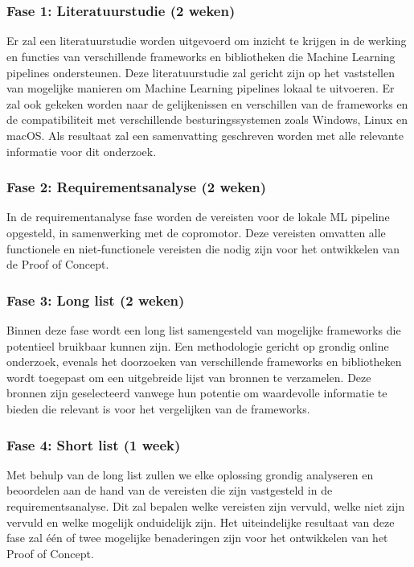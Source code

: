
\chapter{}%
\label{ch:methodologie}

\subsection{Fase 1: Literatuurstudie (2 weken)}
Er zal een literatuurstudie worden uitgevoerd om inzicht te krijgen in de werking en
functies van verschillende frameworks en bibliotheken die Machine Learning pipelines ondersteunen.
Deze literatuurstudie zal gericht zijn op het vaststellen van mogelijke manieren om Machine Learning pipelines lokaal te uitvoeren. Er zal ook gekeken worden naar de gelijkenissen en verschillen van de frameworks en de compatibiliteit met verschillende besturingssystemen zoals Windows, Linux en macOS.
Als resultaat zal een samenvatting geschreven worden met alle relevante informatie voor dit onderzoek.
\subsection{Fase 2: Requirementsanalyse (2 weken)}
In de requirementanalyse fase worden de vereisten voor de lokale ML pipeline opgesteld, in samenwerking met de copromotor. Deze vereisten omvatten alle functionele en niet-functionele vereisten die nodig zijn voor het ontwikkelen van de Proof of Concept.

\subsection{Fase 3: Long list (2 weken)}
Binnen deze fase wordt een long list samengesteld van mogelijke frameworks die potentieel bruikbaar kunnen zijn. Een methodologie gericht op grondig online onderzoek, evenals het doorzoeken van verschillende frameworks en bibliotheken wordt toegepast om een uitgebreide lijst van bronnen te verzamelen. Deze bronnen zijn geselecteerd vanwege hun potentie om waardevolle informatie te bieden die relevant is voor het vergelijken van de frameworks.
\subsection{Fase 4: Short list (1 week)}
Met behulp van de long list zullen we elke oplossing grondig analyseren en beoordelen aan de hand van de vereisten die zijn vastgesteld in de requirementsanalyse. Dit zal bepalen welke vereisten zijn vervuld, welke niet zijn vervuld en welke mogelijk onduidelijk zijn. Het uiteindelijke resultaat van deze fase zal één of twee mogelijke benaderingen zijn voor het ontwikkelen van het Proof of Concept.
